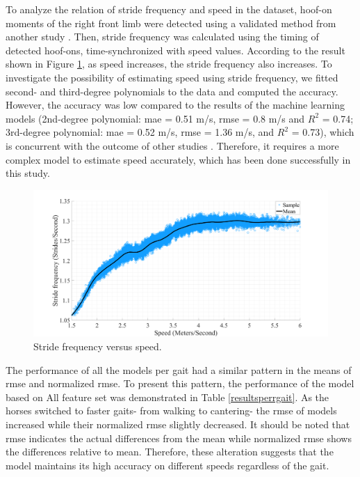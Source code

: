 To analyze the relation of stride frequency and speed in the dataset, hoof-on moments of the right front limb were detected using a validated method from another study \cite{adsd1}. Then, stride frequency was calculated using the timing of detected hoof-ons, time-synchronized with speed values. According to the result shown in Figure \ref{stridevsspeed}, as speed increases, the stride frequency also increases. To investigate the possibility of estimating speed using stride frequency, we fitted second- and third-degree polynomials to the data and computed the accuracy. However, the accuracy was low compared to the results of the machine learning models (2nd-degree polynomial: \gls{mae} = 0.51 m/s, \gls{rmse} = 0.8 m/s and $R^{2}$ = 0.74; 3rd-degree polynomial: \gls{mae} = 0.52 m/s, \gls{rmse} = 1.36 m/s, and $R^{2}$ = 0.73), which is concurrent with the outcome of other studies \cite{articlewalk,trot4.tb04375.x}. Therefore, it requires a more complex model to estimate speed accurately, which has been done successfully in this study.

\begin{figure}[htbp]
\centering
\includegraphics[width=\linewidth]{chapters/Speed/figures/untitledd_HQ.png}
\caption{Stride frequency versus speed.}
\label{stridevsspeed}
\end{figure}

The performance of all the models per gait had a similar pattern in the means of \gls{rmse} and normalized \gls{rmse}. To present this pattern, the performance of the model based on All feature set was demonstrated in Table \ref{resultsperrgait}. As the horses switched to faster gaits- from walking to cantering- the \gls{rmse} of models increased while their normalized \gls{rmse} slightly decreased. It should be noted that \gls{rmse} indicates the actual differences from the mean while normalized \gls{rmse} shows the differences relative to mean. Therefore, these alteration suggests that the model maintains its high accuracy on different speeds regardless of the gait.

